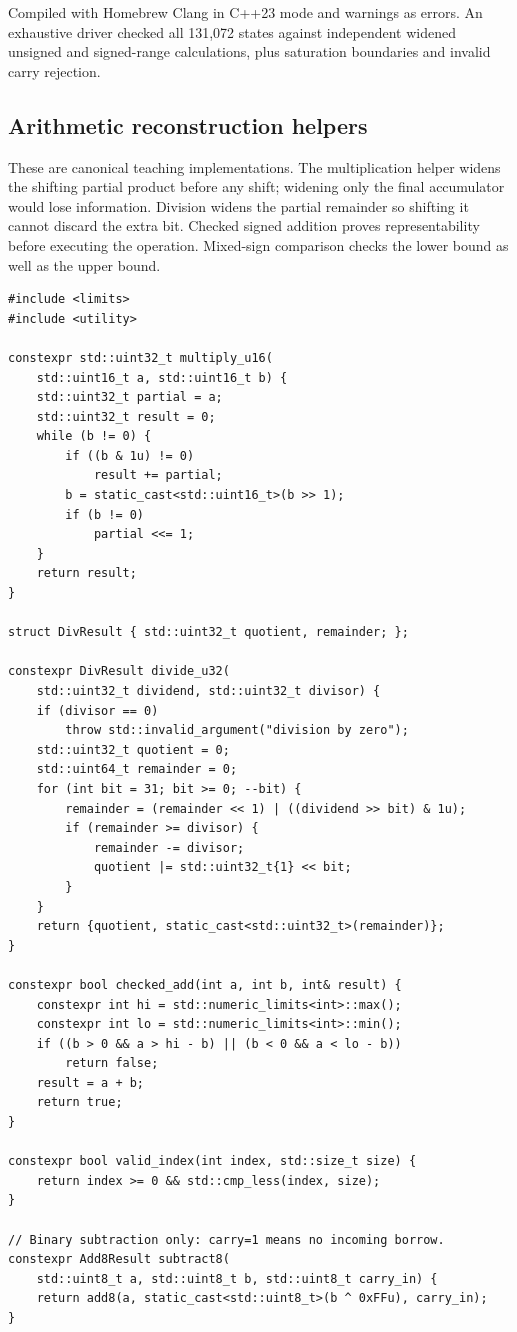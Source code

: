 \hypertarget{appendix-4e2236f53445-verification-1}{}

Compiled with Homebrew Clang in C++23 mode and warnings as errors. An exhaustive driver checked all 131,072  states against independent widened unsigned and signed-range calculations, plus saturation boundaries and invalid carry rejection.

\subsection{Arithmetic reconstruction helpers}\label{appendix-4e2236f53445-arithmetic-reconstruction-helpers}

\hypertarget{appendix-4e2236f53445-arithmetic-reconstruction-helpers}{}

These are canonical teaching implementations. The multiplication helper widens the shifting partial product before any shift; widening only the final accumulator would lose information. Division widens the partial remainder so shifting it cannot discard the extra bit. Checked signed addition proves representability before executing the operation. Mixed-sign comparison checks the lower bound as well as the upper bound.

\begin{verbatim}
#include <limits>
#include <utility>

constexpr std::uint32_t multiply_u16(
    std::uint16_t a, std::uint16_t b) {
    std::uint32_t partial = a;
    std::uint32_t result = 0;
    while (b != 0) {
        if ((b & 1u) != 0)
            result += partial;
        b = static_cast<std::uint16_t>(b >> 1);
        if (b != 0)
            partial <<= 1;
    }
    return result;
}

struct DivResult { std::uint32_t quotient, remainder; };

constexpr DivResult divide_u32(
    std::uint32_t dividend, std::uint32_t divisor) {
    if (divisor == 0)
        throw std::invalid_argument("division by zero");
    std::uint32_t quotient = 0;
    std::uint64_t remainder = 0;
    for (int bit = 31; bit >= 0; --bit) {
        remainder = (remainder << 1) | ((dividend >> bit) & 1u);
        if (remainder >= divisor) {
            remainder -= divisor;
            quotient |= std::uint32_t{1} << bit;
        }
    }
    return {quotient, static_cast<std::uint32_t>(remainder)};
}

constexpr bool checked_add(int a, int b, int& result) {
    constexpr int hi = std::numeric_limits<int>::max();
    constexpr int lo = std::numeric_limits<int>::min();
    if ((b > 0 && a > hi - b) || (b < 0 && a < lo - b))
        return false;
    result = a + b;
    return true;
}

constexpr bool valid_index(int index, std::size_t size) {
    return index >= 0 && std::cmp_less(index, size);
}

// Binary subtraction only: carry=1 means no incoming borrow.
constexpr Add8Result subtract8(
    std::uint8_t a, std::uint8_t b, std::uint8_t carry_in) {
    return add8(a, static_cast<std::uint8_t>(b ^ 0xFFu), carry_in);
}
\end{verbatim}


